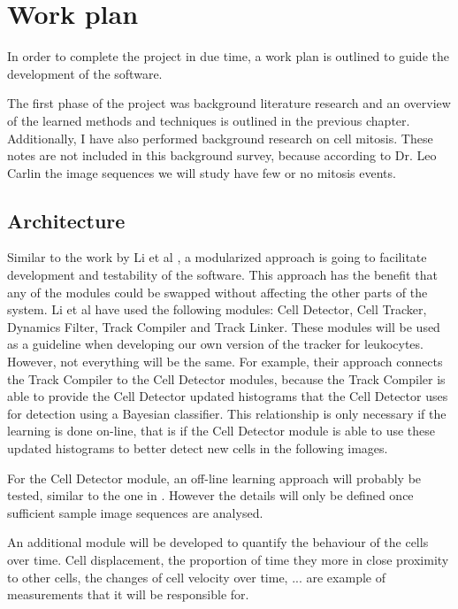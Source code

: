 \documentclass[12pt,a4paper,openany]{book}
\begin{document}
\chapter{Work plan}
\label{chap:workplan}

In order to complete the project in due time, a work plan is outlined to guide the development of the software.

The first phase of the project was background literature research and an overview of the learned methods and techniques is outlined in the previous chapter. Additionally, I have also performed background research on cell mitosis. These notes are not included in this background survey, because according to Dr. Leo Carlin the image sequences we will study have few or no mitosis events.

\section{Architecture}

Similar to the work by Li et al \cite{li07}, a modularized approach is going to facilitate development and testability of the software. This approach has the benefit that any of the modules could be swapped without affecting the other parts of the system. Li et al have used the following modules: Cell Detector, Cell Tracker, Dynamics Filter, Track Compiler and Track Linker. These modules will be used as a guideline when developing our own version of the tracker for leukocytes. However, not everything will be the same. For example, their approach connects the Track Compiler to the Cell Detector modules, because the Track Compiler is able to provide the Cell Detector updated histograms that the Cell Detector uses for detection using a Bayesian classifier. This relationship is only necessary if the learning is done on-line, that is if the Cell Detector module is able to use these updated histograms to better detect new cells in the following images.

For the Cell Detector module, an off-line learning approach will probably be tested, similar to the one in \cite{arteta12}\cite{arteta13}. However the details will only be defined once sufficient sample image sequences are analysed.

An additional module will be developed to quantify the behaviour of the cells over time. Cell displacement, the proportion of time they more in close proximity to other cells, the changes of cell velocity over time, ... are example of measurements that it will be responsible for.
\end{document}
